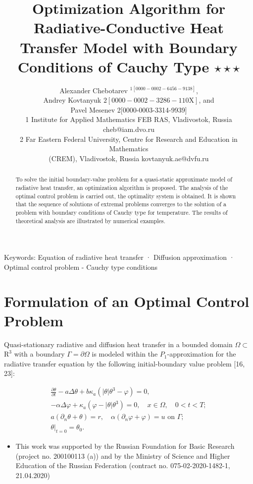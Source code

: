\documentclass[10pt]{article}
\title{Optimization Algorithm for Radiative-Conductive Heat Transfer Model with Boundary Conditions of Cauchy Type $\star \star \star$ }
\author{Alexander Chebotarev ${ }^{1[0000-0002-6456-9138]}$,\\
Andrey Kovtanyuk $2[0000-0002-3286-110 \mathrm{X}]$, and\\
Pavel Mesenev 2[0000-0003-3314-9939]\\
1 Institute for Applied Mathematics FEB RAS, Vladivostok, Russia\\
cheb@iam.dvo.ru\\
2 Far Eastern Federal University, Centre for Research and Education in Mathematics\\
(CREM), Vladivostok, Russia kovtanyuk.ae@dvfu.ru}
\date{}
\begin{document}
\maketitle


\begin{abstract}
To solve the initial boundary-value problem for a quasi-static approximate model of radiative heat transfer, an optimization algorithm is proposed. The analysis of the optimal control problem is carried out, the optimality system is obtained. It is shown that the sequence of solutions of extremal problems converges to the solution of a problem with boundary conditions of Cauchy type for temperature. The results of theoretical analysis are illustrated by numerical examples.
\end{abstract}

Keywords: Equation of radiative heat transfer · Diffusion approximation · Optimal control problem - Cauchy type conditions

\section{Formulation of an Optimal Control Problem}
Quasi-stationary radiative and diffusion heat transfer in a bounded domain $\Omega \subset$ $\mathrm{R}^{3}$ with a boundary $\Gamma=\partial \Omega$ is modeled within the $P_{1}$-approximation for the radiative transfer equation by the following initial-boundary value problem [16, 23]:

$$
\begin{gathered}
\frac{\partial \theta}{\partial t}-a \Delta \theta+b \kappa_{a}\left(|\theta| \theta^{3}-\varphi\right)=0, \\
-\alpha \Delta \varphi+\kappa_{a}\left(\varphi-|\theta| \theta^{3}\right)=0, \quad x \in \Omega, \quad 0<t<T ; \\
a\left(\partial_{n} \theta+\theta\right)=r, \quad \alpha\left(\partial_{n} \varphi+\varphi\right)=u \text { on } \Gamma ; \\
\left.\theta\right|_{t=0}=\theta_{0} .
\end{gathered}
$$

\begin{itemize}
  \item This work was supported by the Russian Foundation for Basic Research (project no. 200100113 (a)) and by the Ministry of Science and Higher Education of the Russian Federation (contract no. 075-02-2020-1482-1, 21.04.2020)
\end{itemize}
\end{document}
